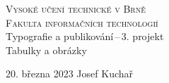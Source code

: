 \documentclass[twocolumn,11pt]{article}
\theoremstyle{plain}
\theoremstyle{plain}
\begin{document}
\begin{titlepage}
    \begin{center}
        {\textsc{{\Huge Vysoké učení technické v Brně\\[0.5em]\huge{Fakulta informačních technologií}}\\}}
        {\LARGE{Typografie a publikování\,--\,3. projekt}\\[0.4em]}
        {\LARGE{Tabulky a obrázky}}
    \end{center}
    {\Large 20. března 2023 \hfill Josef Kuchař}
\end{titlepage}
\clearpage
\end{document}
